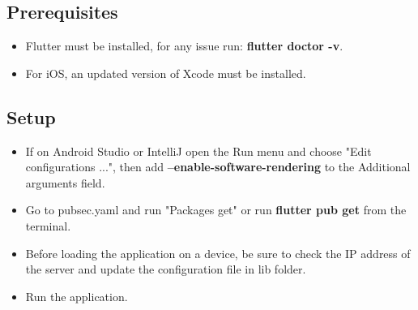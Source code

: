 \subsection{Prerequisites}
\begin{itemize}
	\item Flutter must be installed, for any issue run: \textbf{flutter doctor -v}.
	\item For iOS, an updated version of Xcode must be installed.
\end{itemize}

\subsection{Setup}
\begin{itemize}
	\item If on Android Studio or IntelliJ open the Run menu and choose "Edit configurations ...", then add \textbf{--enable-software-rendering} to the Additional arguments field.
	\item Go to pubsec.yaml and run "Packages get" or run \textbf{flutter pub get} from the terminal.
	\item Before loading the application on a device, be sure to check the IP address of the server and update the configuration file in lib folder.
	\item Run the application.
\end{itemize}
